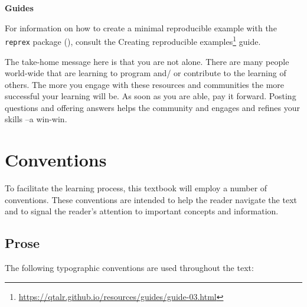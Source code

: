 \documentclass[
  letterpaper,
]{latex/krantz}
\theoremstyle{definition}
\theoremstyle{remark}
\DeclareRobustCommand{\href}[2]{#2\footnote{\url{#1}}}
\begin{document}
\begin{tcolorbox}[enhanced jigsaw, colframe=quarto-callout-color-frame, breakable, bottomrule=.15mm, arc=.35mm, left=2mm, opacityback=0, rightrule=.15mm, colback=white, toprule=.15mm, leftrule=.75mm]

\textbf{ Guides}

For information on how to create a minimal reproducible example with the
\texttt{reprex} package (),
consult the
\href{https://qtalr.github.io/resources/guides/guide-03.html}{Creating
reproducible examples} guide.

\end{tcolorbox}

The take-home message here is that you are not alone. There are many
people world-wide that are learning to program and/ or contribute to the
learning of others. The more you engage with these resources and
communities the more successful your learning will be. As soon as you
are able, pay it forward. Posting questions and offering answers helps
the community and engages and refines your skills --a win-win.

\section*{Conventions}\label{sec-p-conventions}


To facilitate the learning process, this textbook will employ a number
of conventions. These conventions are intended to help the reader
navigate the text and to signal the reader's attention to important
concepts and information.

\subsection*{Prose}\label{sec-p-prose}

The following typographic conventions are used throughout the text:
\end{document}
